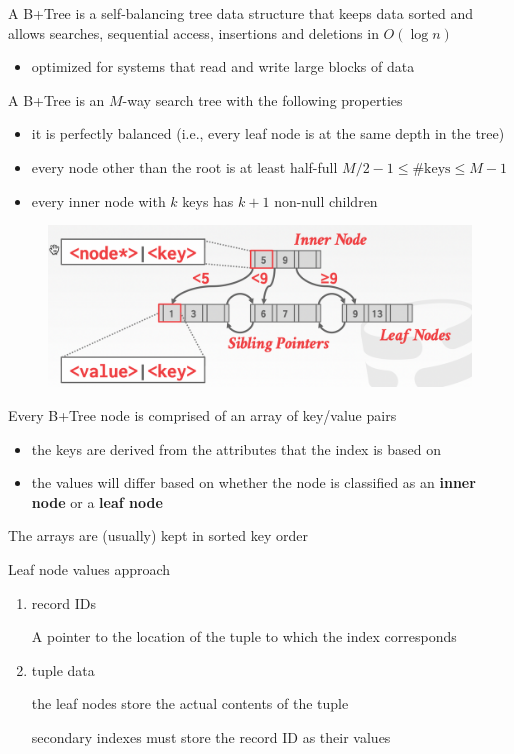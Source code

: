 \documentclass[11pt]{article}
\begin{document}
A B+Tree is a self-balancing tree data structure that keeps data sorted and allows searches,
sequential access, insertions and deletions in \(O(\log n)\)
\begin{itemize}
\item optimized for systems that read and write large blocks of data
\end{itemize}

A B+Tree is an \(M\)-way search tree with the following properties
\begin{itemize}
\item it is perfectly balanced (i.e., every leaf node is at the same depth in the tree)
\item every node other than the root is at least half-full \(M/2-1\le\text{\#keys}\le M-1\)
\item every inner node with \(k\)  keys has \(k+1\) non-null children
\end{itemize}
\begin{figure}[htbp]
\centering
\includegraphics[width=.7\textwidth]{../images/15445/18.png}
\label{}
\end{figure}

Every B+Tree node is comprised of an array of key/value pairs
\begin{itemize}
\item the keys are derived from  the attributes that the index is based on
\item the values will differ based on whether the node is classified as an \textbf{inner node} or a \textbf{leaf node}
\end{itemize}

The arrays are (usually) kept in sorted key order

Leaf node values approach
\begin{enumerate}
\item record IDs

A pointer to the location of the tuple to which the index corresponds

\item tuple data

the leaf nodes store the actual contents of the tuple

secondary indexes must store the record ID as their values
\end{enumerate}
\end{document}
